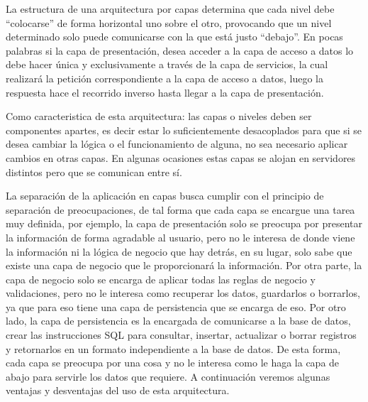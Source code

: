 La estructura de una arquitectura por capas determina que cada nivel debe ``colocarse'' de forma
horizontal uno sobre el otro, provocando que un nivel determinado solo puede comunicarse con la que 
est\'a justo ``debajo''. En pocas palabras si la capa de presentaci\'on, desea acceder a la capa de acceso a datos
lo debe hacer \'unica y exclusivamente a trav\'es de la capa de servicios, la cual realizar\'a
la petici\'on correspondiente a la capa de acceso a datos, luego la respuesta hace el recorrido
inverso hasta llegar a la capa de presentaci\'on. 

Como caracteristica de esta arquitectura: las capas o niveles deben ser componentes apartes, 
es decir estar lo suficientemente desacoplados para que si se desea cambiar la l\'ogica o el 
funcionamiento de alguna, no sea necesario aplicar cambios en otras capas. En algunas ocasiones
estas capas se alojan en servidores distintos pero que se comunican entre s\'i. 

La separación de la aplicación en capas busca cumplir con el principio de separación de 
preocupaciones\cite{separation}, de tal forma que cada capa se encargue una tarea muy definida, por ejemplo,
la capa de presentación solo se preocupa por presentar la información de forma agradable 
al usuario, pero no le interesa de donde viene la información ni la lógica de negocio que 
hay detrás, en su lugar, solo sabe que existe una capa de negocio que le proporcionará la 
información. Por otra parte, la capa de negocio solo se encarga de aplicar todas las 
reglas de negocio y validaciones, pero no le interesa como recuperar los datos, guardarlos
o borrarlos, ya que para eso tiene una capa de persistencia que se encarga de eso. 
Por otro lado, la capa de persistencia es la encargada de comunicarse a la base de datos,
crear las instrucciones SQL para consultar, insertar, actualizar o borrar registros 
y retornarlos en un formato independiente a la base de datos. De esta forma, cada capa 
se preocupa por una cosa y no le interesa como le haga la capa de abajo para servirle 
los datos que requiere. A continuaci\'on veremos algunas ventajas y desventajas del uso 
de esta arquitectura.

